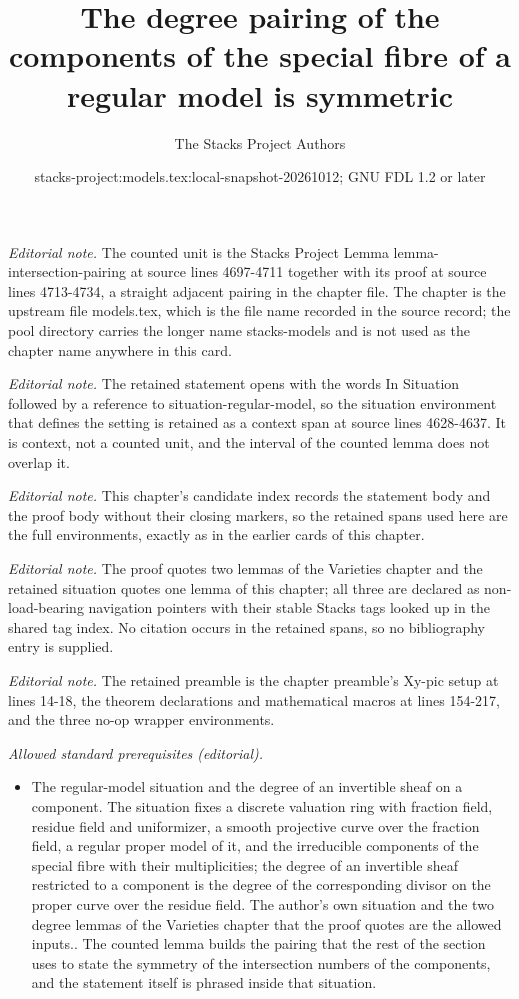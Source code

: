 \documentclass[10pt,a4paper]{amsart}
\title{The degree pairing of the components of the special fibre of a regular model is symmetric}
\author{The Stacks Project Authors}
\date{stacks-project:models.tex:local-snapshot-20261012; GNU FDL 1.2 or later}
\theoremstyle{plain}
\theoremstyle{definition}
\theoremstyle{remark}
\numberwithin{equation}{subsection}
\begin{document}
\maketitle
\noindent\textit{Editorial note.} The counted unit is the Stacks Project Lemma lemma-intersection-pairing at source lines 4697-4711 together with its proof at source lines 4713-4734, a straight adjacent pairing in the chapter file. The chapter is the upstream file models.tex, which is the file name recorded in the source record; the pool directory carries the longer name stacks-models and is not used as the chapter name anywhere in this card.\par\medskip
\noindent\textit{Editorial note.} The retained statement opens with the words In Situation followed by a reference to situation-regular-model, so the situation environment that defines the setting is retained as a context span at source lines 4628-4637. It is context, not a counted unit, and the interval of the counted lemma does not overlap it.\par\medskip
\noindent\textit{Editorial note.} This chapter's candidate index records the statement body and the proof body without their closing markers, so the retained spans used here are the full environments, exactly as in the earlier cards of this chapter.\par\medskip
\noindent\textit{Editorial note.} The proof quotes two lemmas of the Varieties chapter and the retained situation quotes one lemma of this chapter; all three are declared as non-load-bearing navigation pointers with their stable Stacks tags looked up in the shared tag index. No citation occurs in the retained spans, so no bibliography entry is supplied.\par\medskip
\noindent\textit{Editorial note.} The retained preamble is the chapter preamble's Xy-pic setup at lines 14-18, the theorem declarations and mathematical macros at lines 154-217, and the three no-op wrapper environments.\par\medskip
\noindent\textit{Allowed standard prerequisites (editorial).}\begin{itemize}
\item The regular-model situation and the degree of an invertible sheaf on a component. The situation fixes a discrete valuation ring with fraction field, residue field and uniformizer, a smooth projective curve over the fraction field, a regular proper model of it, and the irreducible components of the special fibre with their multiplicities; the degree of an invertible sheaf restricted to a component is the degree of the corresponding divisor on the proper curve over the residue field. The author's own situation and the two degree lemmas of the Varieties chapter that the proof quotes are the allowed inputs.. The counted lemma builds the pairing that the rest of the section uses to state the symmetry of the intersection numbers of the components, and the statement itself is phrased inside that situation.
\end{itemize}\medskip
\end{document}
